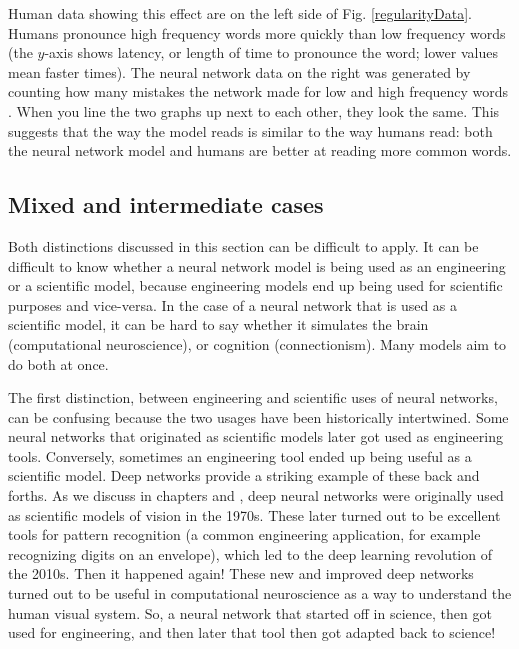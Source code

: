 Human data showing this effect are on the left side of Fig. \ref{regularityData}. Humans pronounce high frequency words more quickly than  low frequency words (the $y$-axis shows latency, or length of time to pronounce the word; lower values mean faster times). The neural network data on the right  was generated by counting how many mistakes the network made for low and high frequency words \cite{seidenberg1989distributed}. When you line the two graphs up next to each other, they look the same. This suggests that the way the model reads is similar to the way humans read: both the neural network model and humans are better at reading more common words.

\subsection{Mixed and intermediate cases}\label{mixedCases}

Both distinctions discussed in this section can be difficult to apply. It can be difficult to know whether a neural network model is being used as an engineering or a scientific model, because engineering models end up being used for scientific purposes and vice-versa. In the case of a neural network that is used as a scientific model, it can be hard to say whether it simulates the brain (computational neuroscience), or cognition (connectionism). Many models aim to do both at once.

The first distinction, between engineering and scientific uses of neural networks, can be confusing because the two usages have been historically intertwined. Some neural networks that originated as scientific models later got used as engineering tools. Conversely, sometimes an engineering tool ended up being useful as a scientific model. Deep networks provide a striking example of these back and forths. As we discuss in chapters  and  , deep neural networks  were originally used as scientific models of vision in the 1970s. These later turned out to be excellent tools for pattern recognition (a common engineering application, for example recognizing digits on an envelope), which led to the deep learning revolution of the 2010s. Then it happened again! These new and improved deep networks turned out to be useful in computational neuroscience as a way to understand the human visual system. So, a neural network that started off in science, then got used for engineering, and then later that tool then got adapted back to science! 


